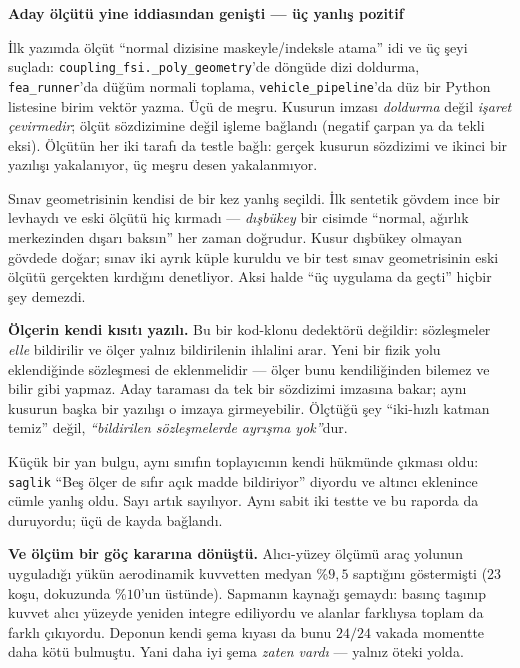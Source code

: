 \documentclass[11pt,a4paper]{article}
\newcommand{\kkkenar}{lacivert}
\newcommand{\kkzemin}{kod}
\newenvironment{renkkutu}[3]{%
  \renewcommand{\kkkenar}{#1}\renewcommand{\kkzemin}{#2}%
  \par\medskip\noindent
  \begin{lrbox}{\kutugovde}%
  \begin{minipage}{\dimexpr\linewidth-2\fboxsep-2\fboxrule\relax}\footnotesize
  \textcolor{#1}{\textbf{#3}}\par\vspace{3pt}%
}{%
  \end{minipage}%
  \end{lrbox}%
  \noindent\fcolorbox{\kkkenar}{\kkzemin}{\usebox{\kutugovde}}%
  \par\medskip
}
\newenvironment{dikkat}[1]{\begin{renkkutu}{orta}{ortabg}{#1}}{\end{renkkutu}}
\begin{document}
\begin{dikkat}{Aday ölçütü yine iddiasından genişti --- üç yanlış pozitif}
İlk yazımda ölçüt ``normal dizisine maskeyle/indeksle atama'' idi ve üç
şeyi suçladı: \texttt{coupling\_fsi.\_poly\_geometry}'de döngüde dizi
doldurma, \texttt{fea\_runner}'da düğüm normali toplama,
\texttt{vehicle\_pipeline}'da düz bir Python listesine birim vektör
yazma. Üçü de meşru. Kusurun imzası \emph{doldurma} değil \emph{işaret
çevirmedir}; ölçüt sözdizimine değil işleme bağlandı (negatif çarpan ya
da tekli eksi). Ölçütün her iki tarafı da testle bağlı: gerçek kusurun
sözdizimi ve ikinci bir yazılışı yakalanıyor, üç meşru desen
yakalanmıyor.

\noindent Sınav geometrisinin kendisi de bir kez yanlış seçildi. İlk
sentetik gövdem ince bir levhaydı ve eski ölçütü hiç kırmadı ---
\emph{dışbükey} bir cisimde ``normal, ağırlık merkezinden dışarı baksın''
her zaman doğrudur. Kusur dışbükey olmayan gövdede doğar; sınav iki ayrık
küple kuruldu ve bir test sınav geometrisinin eski ölçütü gerçekten
kırdığını denetliyor. Aksi halde ``üç uygulama da geçti'' hiçbir şey
demezdi.
\end{dikkat}

\noindent \textbf{Ölçerin kendi kısıtı yazılı.} Bu bir kod-klonu
dedektörü değildir: sözleşmeler \emph{elle} bildirilir ve ölçer yalnız
bildirilenin ihlalini arar. Yeni bir fizik yolu eklendiğinde sözleşmesi
de eklenmelidir --- ölçer bunu kendiliğinden bilemez ve bilir gibi
yapmaz. Aday taraması da tek bir sözdizimi imzasına bakar; aynı kusurun
başka bir yazılışı o imzaya girmeyebilir. Ölçtüğü şey ``iki-hızlı katman
temiz'' değil, \emph{``bildirilen sözleşmelerde ayrışma yok''}dur.

\noindent Küçük bir yan bulgu, aynı sınıfın toplayıcının kendi hükmünde
çıkması oldu: \texttt{saglik} ``Beş ölçer de sıfır açık madde bildiriyor''
diyordu ve altıncı eklenince cümle yanlış oldu. Sayı artık sayılıyor.
Aynı sabit iki testte ve bu raporda da duruyordu; üçü de kayda
bağlandı.

\medskip
\noindent \textbf{Ve ölçüm bir göç kararına dönüştü.} Alıcı-yüzey ölçümü
araç yolunun uyguladığı yükün aerodinamik kuvvetten medyan \%$9{,}5$
saptığını göstermişti (23 koşu, dokuzunda \%$10$'un üstünde). Sapmanın
kaynağı şemaydı: basınç taşınıp kuvvet alıcı yüzeyde yeniden integre
ediliyordu ve alanlar farklıysa toplam da farklı çıkıyordu. Deponun kendi
şema kıyası da bunu $24/24$ vakada momentte daha kötü bulmuştu. Yani daha
iyi şema \emph{zaten vardı} --- yalnız öteki yolda.
\end{document}
